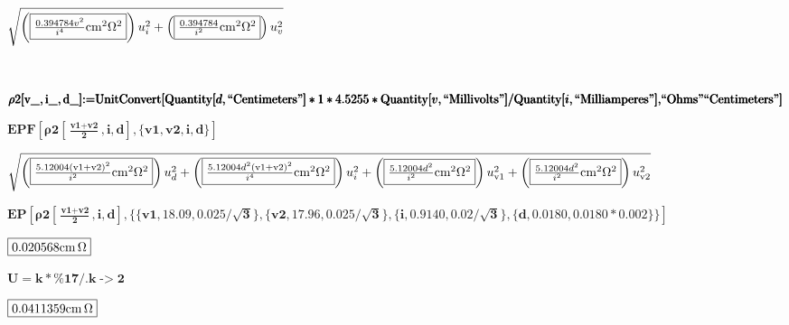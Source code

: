 \documentclass{article}
\begin{document}
\begin{doublespace}
\noindent\(\sqrt{\left(\fbox{$\frac{0.394784 v^2}{i^4}\text{cm}^2\Omega ^2$}\right) u_i^2+\left(\fbox{$\frac{0.394784}{i^2}\text{cm}^2\Omega ^2$}\right)
u_v^2}\)
\end{doublespace}

\begin{doublespace}
\noindent\(\pmb{\text{}}\)
\end{doublespace}

\begin{doublespace}
\noindent\(\pmb{\text{$\rho $2}[\text{v$\_$},\text{i$\_$},\text{d$\_$}]\text{:=}\text{UnitConvert}[\text{Quantity}[d,\text{{``}Centimeters{''}}]*1*4.5255*\text{Quantity}[v,\text{{``}Millivolts{''}}]/\text{Quantity}[i,\text{{``}Milliamperes{''}}],}\\
\pmb{\text{{``}Ohms{''}} \text{{``}Centimeters{''}}]}\)
\end{doublespace}

\begin{doublespace}
\noindent\(\pmb{\text{EPF}\left[\text{$\rho $2}\left[\frac{\text{v1}+\text{v2}}{2},i,d\right],\{\text{v1},\text{v2},i,d\}\right]}\)
\end{doublespace}

\begin{doublespace}
\noindent\(\sqrt{\left(\fbox{$\frac{5.12004 (\text{v1}+\text{v2})^2}{i^2}\text{cm}^2\Omega ^2$}\right) u_d^2+\left(\fbox{$\frac{5.12004 d^2 (\text{v1}+\text{v2})^2}{i^4}\text{cm}^2\Omega
^2$}\right) u_i^2+\left(\fbox{$\frac{5.12004 d^2}{i^2}\text{cm}^2\Omega ^2$}\right) u_{\text{v1}}^2+\left(\fbox{$\frac{5.12004 d^2}{i^2}\text{cm}^2\Omega
^2$}\right) u_{\text{v2}}^2}\)
\end{doublespace}

\begin{doublespace}
\noindent\(\pmb{\text{EP}\left[\text{$\rho $2}\left[\frac{\text{v1}+\text{v2}}{2},i,d\right],\{\{\text{v1},18.09,0.025/\surd 3\},\{\text{v2},17.96,0.025/\surd
3\},\{i,0.9140,0.02/\surd 3\},\{d,0.0180,0.0180*0.002\}\}\right]}\)
\end{doublespace}

\begin{doublespace}
\noindent\(\fbox{$0.020568\text{cm}\, \Omega $}\)
\end{doublespace}

\begin{doublespace}
\noindent\(\pmb{U=k*\text{$\%$17}\text{/.}k\text{-$>$}2}\)
\end{doublespace}

\begin{doublespace}
\noindent\(\fbox{$0.0411359\text{cm}\, \Omega $}\)
\end{doublespace}
\end{document}
